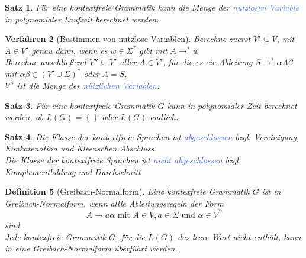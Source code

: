 \documentclass[11pt]{article}
\newcommand{\tcol}[1]{\textcolor{RoyalBlue}{#1}}
\newcommand{\set}[1]{\left\lbrace #1\right\rbrace}
\theoremstyle{break}
\newtheorem{satz}{Satz}[section]
\newtheorem{defi}[satz]{Definition}
\newtheorem{verf}[satz]{Verfahren}
\begin{document}
\begin{satz}
Für eine kontextfreie Grammatik kann die Menge der \tcol{nutzlosen Variable} in polynomialer Laufzeit berechnet werden.
\end{satz}

\begin{verf}[Bestimmen von nutzlose Variablen]
Berechne zuerst $V'\subseteq V$, mit $A\in V'$ genau dann, wenn es $w\in\Sigma^*$ gibt mit $A\rightarrow^*w$\\
Berechne anschließend $V''\subseteq V'$ aller $A\in V'$, für die es eie Ableitung $S\rightarrow^*\alpha A\beta$ mit $\alpha\beta\in(V'\cup\Sigma)^*$ oder $A=S$.\\
$V''$ ist die Menge der \tcol{nützlichen Variablen}.
\end{verf}

\begin{satz}
Für eine kontextfreie Grammatik $G$ kann in polynomialer Zeit berechnet werden, ob $L(G)=\set{}$ oder $L(G)$ endlich.
\end{satz}

\begin{satz}
Die Klasse der kontextfreie Sprachen ist \tcol{abgeschlossen} bzgl. Vereinigung, Konkatenation und Kleenschen Abschluss\\
Die Klasse der kontextfreie Sprachen ist \tcol{nicht abgeschlossen} bzgl. Komplementbildung und Durchschnitt\\
\end{satz}

\begin{defi}[Greibach-Normalform]
Eine kontexfreie Grammatik $G$ ist in Greibach-Normalform, wenn allle Ableitungsregeln der Form
\[A\rightarrow a\alpha\text{ mit }A\in V,a\in\Sigma\text{ und }\alpha\in V^*\]
sind.\\
Jede kontexfreie Grammatik $G$, für die $L(G)$ das leere Wort nicht enthält, kann in eine Greibach-Normalform überführt werden.
\end{defi}

\end{document}
